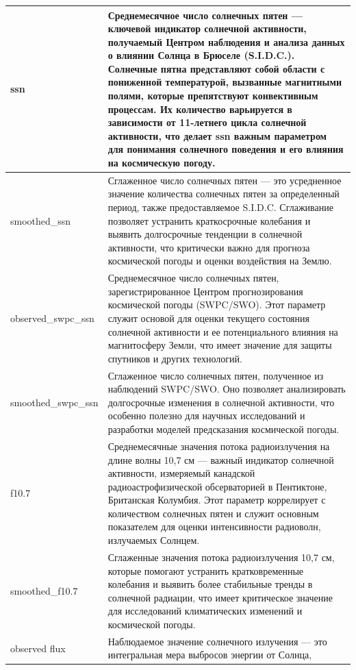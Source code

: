 \documentclass[14pt, a4paper]{bsu}
\begin{document}
\begin{longtable}{|l|p{12cm}|}
	ssn                      & Среднемесячное число солнечных пятен —
	ключевой индикатор солнечной активности, получаемый Центром
	наблюдения и анализа данных о влиянии Солнца в Брюселе (S.I.D.C.).
	Солнечные пятна представляют собой области с пониженной
	температурой, вызванные магнитными полями, которые препятствуют
	конвективным процессам. Их количество варьируется в зависимости от
	11-летнего цикла солнечной активности, что делает ssn важным
	параметром для понимания солнечного поведения и его влияния на
	космическую погоду.                                               \\ \hline smoothed\_ssn         & Сглаженное
	число солнечных пятен — это усредненное значение количества
	солнечных пятен за определенный период, также предоставляемое
	S.I.D.C. Сглаживание позволяет устранить краткосрочные колебания и
	выявить долгосрочные тенденции в солнечной активности, что
	критически важно для прогноза космической погоды и оценки
	воздействия на Землю.
	\\ \hline observed\_swpc\_ssn   & Среднемесячное число солнечных
	пятен, зарегистрированное Центром прогнозирования космической
	погоды (SWPC/SWO). Этот параметр служит основой для оценки текущего
	состояния солнечной активности и ее потенциального влияния на
	магнитосферу Земли, что имеет значение для защиты спутников и
	других технологий.
	\\ \hline smoothed\_swpc\_ssn   & Сглаженное число солнечных пятен,
	полученное из наблюдений SWPC/SWO. Оно позволяет анализировать
	долгосрочные изменения в солнечной активности, что особенно полезно
	для научных исследований и разработки моделей предсказания
	космической погоды.
	\\ \hline f10.7                 & Среднемесячные значения потока
	радиоизлучения на длине волны 10,7 см — важный индикатор солнечной
	активности, измеряемый канадской радиоастрофизической обсерваторией
	в Пентиктоне, Британская Колумбия. Этот параметр коррелирует с
	количеством солнечных пятен и служит основным показателем для
	оценки интенсивности радиоволн, излучаемых Солнцем.
	\\ \hline smoothed\_f10.7       & Сглаженные значения потока
	радиоизлучения 10,7 см, которые помогают устранить кратковременные
	колебания и выявить более стабильные тренды в солнечной радиации,
	что имеет критическое значение для исследований климатических
	изменений и космической погоды.
	\\ \hline observed flux         & Наблюдаемое значение солнечного
	излучения — это интегральная мера выбросов энергии от Солнца,

\end{longtable}
\end{document}
